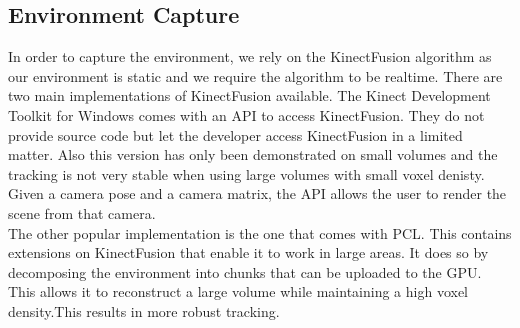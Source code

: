 \subsection{Environment Capture}
In order to capture the environment, we rely on the KinectFusion\cite{newcombe2011kinectfusion}  algorithm as our environment is static and we require the algorithm to be realtime. There are two main implementations of KinectFusion available. The Kinect Development Toolkit for Windows comes with an API to access KinectFusion. They do not provide source code but let the developer access KinectFusion in a limited matter. Also this version has only been demonstrated on small volumes and the tracking is not very stable when using large volumes with small voxel denisty. Given a camera pose and a camera matrix, the API allows the user to render the scene from that camera.\\
The other popular implementation is the one that comes with PCL. This contains extensions on KinectFusion that enable it to work in large areas. It does so by decomposing the environment into chunks that can be uploaded to the GPU. This allows it to reconstruct a large volume while maintaining a high voxel density.This results in more robust tracking.  